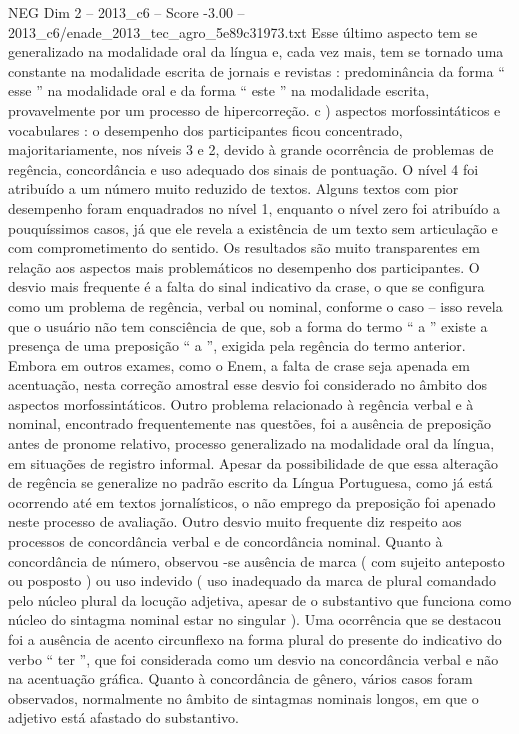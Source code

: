 \begin{textsample}{NEG Dim 2 – 2013\_c6 – Score -3.00 – 2013\_c6/enade\_2013\_tec\_agro\_5e89c31973.txt}
Esse último aspecto tem se generalizado na modalidade oral da língua e, cada vez mais, tem se tornado uma constante na modalidade escrita de jornais e revistas : predominância da forma “ esse ” na modalidade oral e da forma “ este ” na modalidade escrita, provavelmente por um processo de hipercorreção. c ) aspectos morfossintáticos e vocabulares : o desempenho dos participantes ficou concentrado, majoritariamente, nos níveis 3 e 2, devido à grande ocorrência de problemas de regência, concordância e uso adequado dos sinais de pontuação.
O nível 4 foi atribuído a um número muito reduzido de textos.
Alguns textos com pior desempenho foram enquadrados no nível 1, enquanto o nível zero foi atribuído a pouquíssimos casos, já que ele revela a existência de um texto sem articulação e com comprometimento do sentido.
Os resultados são muito transparentes em relação aos aspectos mais problemáticos no desempenho dos participantes.
O desvio mais frequente é a falta do sinal indicativo da crase, o que se configura como um problema de regência, verbal ou nominal, conforme o caso – isso revela que o usuário não tem consciência de que, sob a forma do termo “ a ” existe a presença de uma preposição “ a ”, exigida pela regência do termo anterior.
Embora em outros exames, como o Enem, a falta de crase seja apenada em acentuação, nesta correção amostral esse desvio foi considerado no âmbito dos aspectos morfossintáticos.
Outro problema relacionado à regência verbal e à nominal, encontrado frequentemente nas questões, foi a ausência de preposição antes de pronome relativo, processo generalizado na modalidade oral da língua, em situações de registro informal.
Apesar da possibilidade de que essa alteração de regência se generalize no padrão escrito da Língua Portuguesa, como já está ocorrendo até em textos jornalísticos, o não emprego da preposição foi apenado neste processo de avaliação.
Outro desvio muito frequente diz respeito aos processos de concordância verbal e de concordância nominal.
Quanto à concordância de número, observou -se ausência de marca ( com sujeito anteposto ou posposto ) ou uso indevido ( uso inadequado da marca de plural comandado pelo núcleo plural da locução adjetiva, apesar de o substantivo que funciona como núcleo do sintagma nominal estar no singular ).
Uma ocorrência que se destacou foi a ausência de acento circunflexo na forma plural do presente do indicativo do verbo “ ter ”, que foi considerada como um desvio na concordância verbal e não na acentuação gráfica.
Quanto à concordância de gênero, vários casos foram observados, normalmente no âmbito de sintagmas nominais longos, em que o adjetivo está afastado do substantivo.

\end{textsample}

